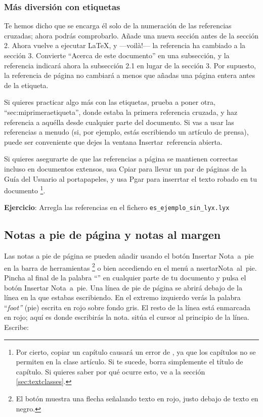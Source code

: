 \subsubsection*{Más diversión con etiquetas}

Te hemos dicho que \LyX{} se encarga él solo de la numeración de las
referencias cruzadas; ahora podrás comprobarlo. Añade una nueva sección
antes de la sección 2. Ahora vuelve a ejecutar \LaTeX{}, y ---voilà!---
la referencia ha cambiado a la sección 3. Convierte {}``Acerca de
este documento'' en una subsección, y la referencia indicará ahora
la subsección 2.1 en lugar de la sección 3. Por supuesto, la referencia
de página no cambiará a menos que añadas una página entera antes de
la etiqueta.

\begin{sloppypar}

Si quieres practicar algo más con las etiquetas, prueba a poner otra,
{}``sec:miprimeraetiqueta'', donde estaba la primera referencia
cruzada, y haz referencia a aquélla desde cualquier parte del documento.
Si vas a usar las referencias a menudo (si, por ejemplo, estás escribiendo
un artículo de prensa), puede ser conveniente que dejes la ventana
\textsf{Insertar~referencia} abierta.

\end{sloppypar}

Si quieres asegurarte de que las referencias a página se mantienen
correctas incluso en documentos extensos, usa \textsf{C}\textsf{}\textsf{piar}
para llevar un par de páginas de la Guía del Usuario al portapapeles,
y usa \textsf{P}\textsf{}\textsf{gar} para inserrtar el
texto robado en tu documento%
\footnote{Por cierto, copiar un capítulo causará un error de \LyX{}, ya que
los capítulos no se permiten en la clase artículo. Si te sucede, borra
simplemente el título de capítulo. Si quieres saber por qué ocurre
esto, ve a la sección \ref{sec:textclasses}.%
}.

\textbf{Ejercicio}: Arregla las referencias en el fichero \texttt{es\_ejemplo\_sin\_lyx.lyx}


\subsection{Notas a pie de página y notas al margen}

Las notas a pie de página se pueden añadir usando el botón \textsf{Insertar
Nota~a~pie} en la barra de herramientas%
\footnote{El botón muestra una flecha señalando texto en rojo, justo debajo
de texto en negro.%
} o bien accediendo en el menú a \textsf{}\textsf{nsertar\lyxarrow{}Nota~al~pie}\@.
Pincha al final de la palabra {}``\LyX{}'' en cualquier parte de
tu documento y pulsa el botón \textsf{Insertar Nota~a~pie}. Una
línea de pie de página se abrirá debajo de la línea en la que estabas
escribiendo. En el extremo izquierdo verás la palabra {}``\emph{foot''}
(pie) escrita en rojo sobre fondo gris. El resto de la línea está
enmarcada en rojo; aquí es donde escribirás la nota. \LyX{} sitúa
el cursor al principio de la línea. Escribe:

